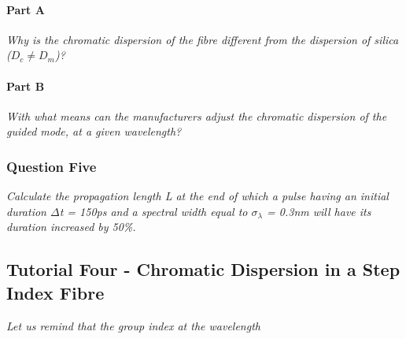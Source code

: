 \documentclass[colorlinks,11pt,a4paper,normalphoto,withhyper,ragged2e]{altareport}
\begin{document}
\paragraph{Part A \linebreak}
\textit{Why is the chromatic dispersion of the fibre different from the dispersion of silica ($D_c \neq D_m$)?} \linebreak




\paragraph{Part B \linebreak}
\textit{With what means can the manufacturers adjust the chromatic dispersion of the guided mode, at a given wavelength?} \linebreak




\subsubsection{Question Five}
\textit{Calculate the propagation length L at the end of which a pulse having an initial duration $\Delta$t = 150ps and a spectral width equal to $\sigma_{\lambda}$ = 0.3nm will have its duration increased by 50\%.} \linebreak




\newpage




\subsection{Tutorial Four - Chromatic Dispersion in a Step Index Fibre}
\textit{Let us remind that the group index at the wavelength } \linebreak




\newpage
{}  %


\end{document}
